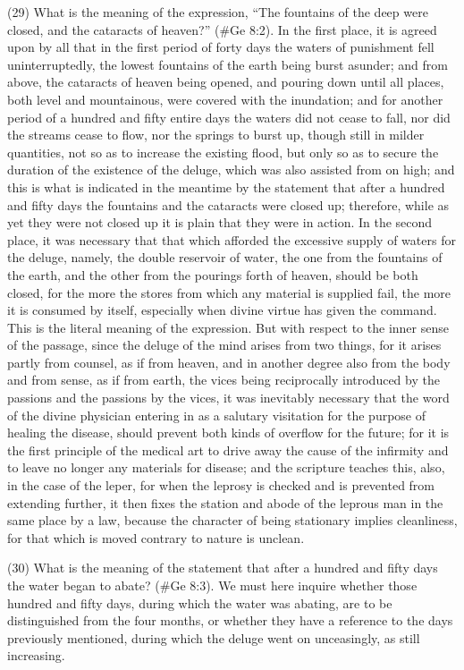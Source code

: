 (29) What is the meaning of the expression, ``The fountains of the deep were closed, and the
cataracts of heaven?'' (\#Ge 8:2). In the first place, it is agreed upon by all that in the first
period of forty days the waters of punishment fell uninterruptedly, the lowest fountains of the earth
being burst asunder; and from above, the cataracts of heaven being opened, and pouring down
until all places, both level and mountainous, were covered with the inundation; and for another
period of a hundred and fifty entire days the waters did not cease to fall, nor did the streams cease
to flow, nor the springs to burst up, though still in milder quantities, not so as to increase the
existing flood, but only so as to secure the duration of the existence of the deluge, which was also
assisted from on high; and this is what is indicated in the meantime by the statement that after a
hundred and fifty days the fountains and the cataracts were closed up; therefore, while as yet they
were not closed up it is plain that they were in action. In the second place, it was necessary that
that which afforded the excessive supply of waters for the deluge, namely, the double reservoir of
water, the one from the fountains of the earth, and the other from the pourings forth of heaven,
should be both closed, for the more the stores from which any material is supplied fail, the more it
is consumed by itself, especially when divine virtue has given the command. This is the literal
meaning of the expression. But with respect to the inner sense of the passage, since the deluge of
the mind arises from two things, for it arises partly from counsel, as if from heaven, and in another
degree also from the body and from sense, as if from earth, the vices being reciprocally introduced
by the passions and the passions by the vices, it was inevitably necessary that the word of the
divine physician entering in as a salutary visitation for the purpose of healing the disease, should
prevent both kinds of overflow for the future; for it is the first principle of the medical art to drive
away the cause of the infirmity and to leave no longer any materials for disease; and the scripture
teaches this, also, in the case of the leper, for when the leprosy is checked and is prevented from
extending further, it then fixes the station and abode of the leprous man in the same place by a law,
because the character of being stationary implies cleanliness, for that which is moved contrary to
nature is unclean.

(30) What is the meaning of the statement that after a hundred and fifty days the water began to
abate? (\#Ge 8:3). We must here inquire whether those hundred and fifty days, during which
the water was abating, are to be distinguished from the four months, or whether they have a
reference to the days previously mentioned, during which the deluge went on unceasingly, as still
increasing.

